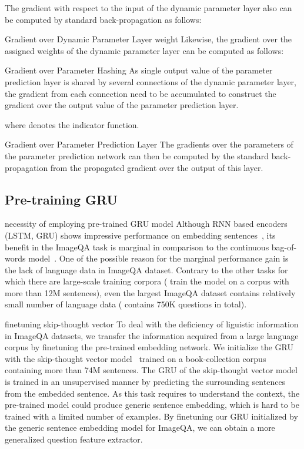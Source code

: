\documentclass[10pt,twocolumn,letterpaper]{article}
\begin{document}
The gradient {\color{cyan}with respect to} the input of {\color{cyan}the dynamic} parameter layer also can be computed by standard back-propagation as follows:


{\color{blue} Gradient over Dynamic Parameter Layer weight}
Likewise, the gradient over the assigned weights of the dynamic parameter layer can be computed as follows:


{\color{blue} Gradient over Parameter Hashing}
As single output value of the parameter prediction layer is shared by several connections of the dynamic parameter layer, the gradient from each connection need to be accumulated to construct the gradient over the output value of the parameter prediction layer\cite{Hashing}.

where  denotes the indicator function.

{\color{blue} Gradient over Parameter Prediction Layer}
{\color{cyan}The gradients} over {\color{cyan}the parameters of the} parameter prediction {\color{cyan}network} can {\color{cyan}then} be computed by {\color{cyan}the standard back-propagation from the propagated gradient over the output of this layer}. 

\subsection{Pre-training GRU}
{\color{blue} necessity of employing pre-trained GRU model}
Although RNN based encoders (\eg LSTM\cite{LSTM}, GRU\cite{chung2014empirical}) shows impressive performance  on {\color{cyan}embedding sentences}~\cite{mikolov2010recurrent, sutskever2014sequence}, its benefit in the ImageQA task is marginal in comparison to the {\color{cyan}continuous bag-of-words model}~\cite{mren2015}.
One of the possible reason for the marginal performance gain is the lack of language data in ImageQA dataset.
Contrary to the other tasks {\color{cyan}for which there are large-scale training corpora} (\eg \cite{sutskever2014sequence} train the model on a corpus with more than 12M sentences), even the largest ImageQA dataset contains relatively small number of language data (\eg \cite{VQA} contains 750K questions in total).

{\color{blue} finetuning skip-thought vector}
To deal with the deficiency {\color{cyan}of liguistic information in ImageQA datasets}, we transfer the information acquired from a large language corpus {\color{cyan}by finetuning the pre-trained embedding network}.
{\color{cyan}We initialize the GRU with the skip-thought vector model~\cite{Skipthought} trained on a book-collection corpus containing more than 74M sentences}.
The {\color{cyan}GRU of the skip-thought vector model} is trained in an unsupervised manner {\color{cyan}by predicting the surrounding sentences from the embedded sentence}.
As this task requires to understand the context, the {\color{cyan}pre-trained model} could produce generic sentence {\color{cyan}embedding}, which is hard to be trained with a limited number of examples.
By finetuning {\color{cyan}our GRU initialized by the generic sentence embedding model} for {\color{cyan}ImageQA}, we can {\color{cyan}obtain a more} generalized question feature extractor.
\fi
\end{document}
